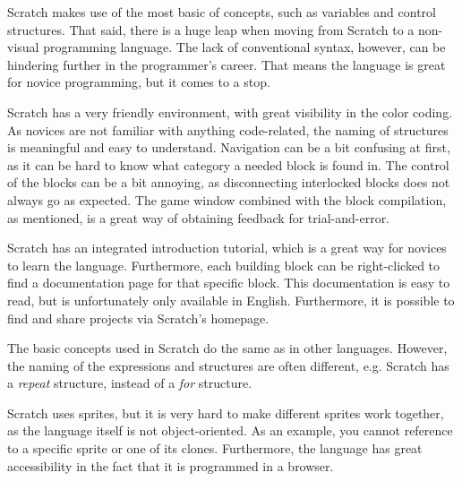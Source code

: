 \begin{description}[style=nextline]
\item[Pedagogic Value] Scratch makes use of the most basic of concepts, such as variables and control structures. That said, there is a huge leap when moving from Scratch to a non-visual programming language. The lack of conventional syntax, however, can be hindering further in the programmer's career. That means the language is great for novice programming, but it comes to a stop.
\item[Environment] Scratch has a very friendly environment, with great visibility in the color coding. As novices are not familiar with anything code-related, the naming of structures is meaningful and easy to understand. Navigation can be a bit confusing at first, as it can be hard to know what category a needed block is found in. The control of the blocks can be a bit annoying, as disconnecting interlocked blocks does not always go as expected. The game window combined with the block compilation, as mentioned, is a great way of obtaining feedback for trial-and-error.
\item[Documentation] Scratch has an integrated introduction tutorial, which is a great way for novices to learn the language. Furthermore, each building block can be right-clicked to find a documentation page for that specific block. This documentation is easy to read, but is unfortunately only available in English. Furthermore, it is possible to find and share projects via Scratch's homepage.
\item[Uniformity] The basic concepts used in Scratch do the same as in other languages. However, the naming of the expressions and structures are often different, e.g. Scratch has a \emph{repeat} structure, instead of a \emph{for} structure.
\item[Miscellaneous] Scratch uses sprites, but it is very hard to make different sprites work together, as the language itself is not object-oriented. As an example, you cannot reference to a specific sprite or one of its clones. Furthermore, the language has great accessibility in the fact that it is programmed in a browser.
\end{description}